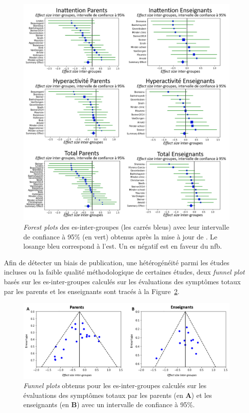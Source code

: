 \begin{figure}[h!]
  \centering
	\includegraphics[width=1\linewidth]{figures/chapter-2/meta-analysis-forest-plots} 
  \caption[\textit{Forest plots} de la mise à jour de \citet{Cortese2016}.]{\textit{Forest plots} des \gls{es}-inter-groupes (les carrés bleus) avec 
	leur intervalle de confiance à 95\% (en vert) obtenus après la mise à jour de 
	\citet{Cortese2016}. Le losange bleu correspond à l'\gls{est}.
	Un \gls{es} négatif est en faveur du \gls{nfb}.}
  \label{Figure:meta_analysis_forest_plots}
\end{figure}

Afin de détecter un biais de publication, une hétérogénéité parmi les études incluses ou la faible qualité méthodologique de certaines études, 
deux \textit{funnel plot} basés sur les \gls{es}-inter-groupes calculés sur les évaluations des symptômes totaux par les parents et les enseignants sont 
tracés à la Figure~\ref{Figure:meta_analysis_funnel_plots}. 

\begin{figure}[h!]
  \centering
	\includegraphics[width=1\linewidth]{figures/chapter-2/meta-analysis-funnel-plots} 
  \caption[\textit{Funnel plots} de la mise à jour de \citet{Cortese2016}.]{\textit{Funnel plots} obtenus pour les \gls{es}-inter-groupes calculés 
	sur les évaluations des symptômes totaux par les parents (en \textbf{A}) et 
	les enseignants (en \textbf{B}) avec un intervalle de confiance à 95\%.}
  \label{Figure:meta_analysis_funnel_plots}
\end{figure}

